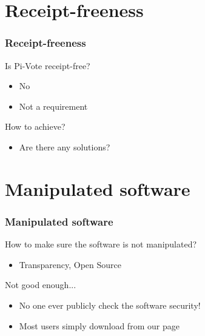 \documentclass[aspectratio=1610, compress, bigger]{beamer}
\begin{document}
\section{Receipt-freeness}
\begin{frame}\frametitle{Receipt-freeness}

\begin{block}{Is Pi-Vote receipt-free?}
\begin{itemize}
\item No
\item Not a requirement
\end{itemize}
\end{block}

\pause

\begin{block}{How to achieve?}
\begin{itemize}
\item Are there any solutions?
\end{itemize}
\end{block}

\end{frame}

\section{Manipulated software}
\begin{frame}\frametitle{Manipulated software}

\begin{block}{How to make sure the software is not manipulated?}
\begin{itemize}
\item Transparency, Open Source
\end{itemize}
\end{block}

\pause

\begin{alertblock}{Not good enough...}
\begin{itemize}
\item No one ever publicly check the software security!
\item Most users simply download from our page
\end{itemize}
\end{alertblock}

\end{frame}
\end{document}
